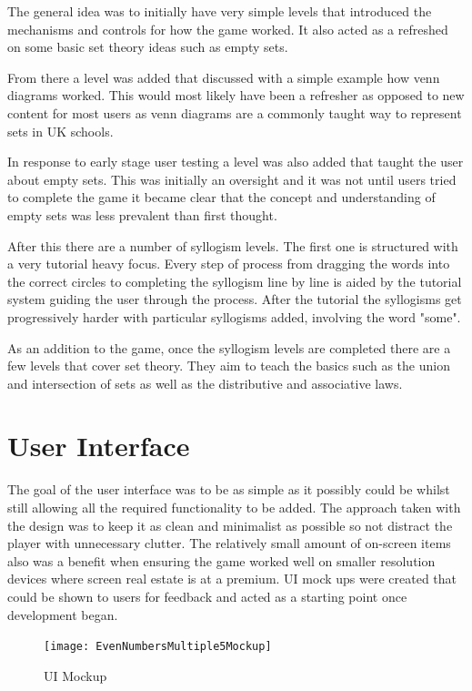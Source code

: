 \documentclass[12pt,a4paper]{report}
\begin{document}
The general idea was to initially have very simple levels that introduced the mechanisms and controls for how the game worked. It also acted as a refreshed on some basic set theory ideas such as empty sets. 

From there a level was added that discussed with a simple example how venn diagrams worked. This would most likely have been a refresher as opposed to new content for most users as venn diagrams are a commonly taught way to represent sets in UK schools.

In response to early stage user testing a level was also added that taught the user about empty sets. This was initially an oversight and it was not until users tried to complete the game it became clear that the concept and understanding of empty sets was less prevalent than first thought.

After this there are a number of syllogism levels. The first one is structured with a very tutorial heavy focus. Every step of process from dragging the words into the correct circles to completing the syllogism line by line is aided by the tutorial system guiding the user through the process. After the tutorial the syllogisms get progressively harder with particular syllogisms added, involving the word "some".

As an addition to the game, once the syllogism levels are completed there are a few levels that cover set theory. They aim to teach the basics such as the union and intersection of sets as well as the distributive and associative laws. 

\section{User Interface}
The goal of the user interface was to be as simple as it possibly could be whilst still allowing all the required functionality to be added. The approach taken with the design was to keep it as clean and minimalist as possible so not distract the player with unnecessary clutter. The relatively small amount of on-screen items also was a benefit when ensuring the game worked well on smaller resolution devices where screen real estate is at a premium. UI mock ups were created that could be shown to users for feedback and acted as a starting point once development began.

\begin{figure}[h]
  \centering
  \begin{minipage}[b]{1\textwidth}
    \texttt{[image: EvenNumbersMultiple5Mockup]}
    \caption{UI Mockup}
  \end{minipage}
\end{figure}
\FloatBarrier
\end{document}

